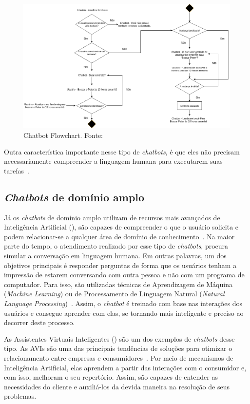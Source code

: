 \begin{figure}
\centering
\includegraphics[width=0.9\linewidth]{src/imagens/Chatbot.png}
\caption{Chatbot Flowchart. Fonte:~\cite{Samer}}
\label{cap:01:fig:fluxograma}
\end{figure}

Outra característica importante nesse tipo de \textit{chatbots}, é que eles não precisam necessariamente compreender a linguagem humana para executarem suas tarefas~\cite{Juliano}.

\subsection{\textit{Chatbots} de domínio amplo}\label{cap:02:sec:01:sub:02:bot-dominio}

Já os \textit{chatbots} de domínio amplo utilizam de recursos mais avançados de Inteligência Artificial (), são capazes de compreender o que o usuário solicita e podem relacionar-se a qualquer área de domínio de conhecimento~\cite{Juliano}. 
Na maior parte do tempo, o atendimento realizado por esse tipo de \textit{chatbots}, procura simular a conversação em linguagem humana.
Em outras palavras, um dos objetivos principais é responder perguntas de forma que os usuários tenham a impressão de estarem conversando com outra pessoa e não com um programa de computador.
Para isso, são utilizadas técnicas de Aprendizagem de Máquina (\textit{Machine Learning}) ou de Processamento de Linguagem Natural (\textit{Natural Language Processing})~\cite{Falaki}. 
Assim, o \textit{chatbot} é treinado com base nas interações dos usuários e consegue aprender com elas, se tornando mais inteligente e preciso ao decorrer deste processo.

As Assistentes Virtuais Inteligentes () são um dos exemplos de \textit{chatbots} desse tipo. 
As AVIs são uma das principais tendências de soluções para otimizar o relacionamento entre empresas e consumidores~\cite{DDS}. 
Por meio de mecanismos de Inteligência Artificial, elas aprendem a partir das interações com o consumidor e, com isso, melhoram o seu repertório. 
Assim, são capazes de entender as necessidades do cliente e auxiliá-los da devida maneira na resolução de seus problemas.

